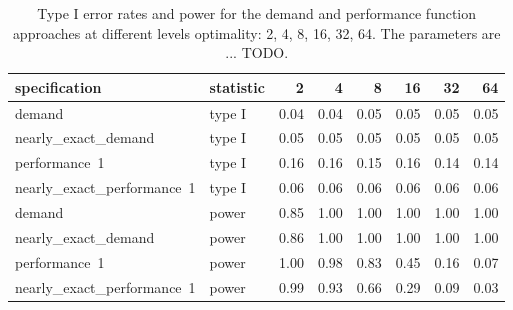 \begin{table}[ht]
\centering
\begingroup\footnotesize
\begin{tabular}{llrrrrrr}
  \hline
specification & statistic & 2 & 4 & 8 & 16 & 32 & 64 \\ 
  \hline
demand & type I & 0.04 & 0.04 & 0.05 & 0.05 & 0.05 & 0.05 \\ 
  nearly_exact_demand & type I & 0.05 & 0.05 & 0.05 & 0.05 & 0.05 & 0.05 \\ 
  performance~1 & type I & 0.16 & 0.16 & 0.15 & 0.16 & 0.14 & 0.14 \\ 
  nearly_exact_performance~1 & type I & 0.06 & 0.06 & 0.06 & 0.06 & 0.06 & 0.06 \\ 
  demand & power & 0.85 & 1.00 & 1.00 & 1.00 & 1.00 & 1.00 \\ 
  nearly_exact_demand & power & 0.86 & 1.00 & 1.00 & 1.00 & 1.00 & 1.00 \\ 
  performance~1 & power & 1.00 & 0.98 & 0.83 & 0.45 & 0.16 & 0.07 \\ 
  nearly_exact_performance~1 & power & 0.99 & 0.93 & 0.66 & 0.29 & 0.09 & 0.03 \\ 
   \hline
\end{tabular}
\endgroup
\caption{Type I error rates and power for the demand and
             performance function approaches at different levels optimality:
             2, 4, 8, 16, 32, 64. The parameters are ... TODO.} 
\label{main-table}
\end{table}
